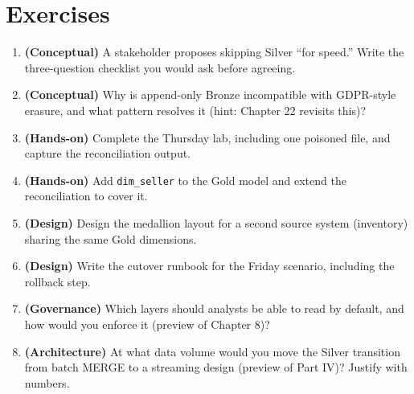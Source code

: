 \section{Exercises}
\begin{enumerate}
    \item \textbf{(Conceptual)} A stakeholder proposes skipping Silver ``for speed.'' Write the three-question checklist you would ask before agreeing.
    \item \textbf{(Conceptual)} Why is append-only Bronze incompatible with GDPR-style erasure, and what pattern resolves it (hint: Chapter 22 revisits this)?
    \item \textbf{(Hands-on)} Complete the Thursday lab, including one poisoned file, and capture the reconciliation output.
    \item \textbf{(Hands-on)} Add \texttt{dim\_seller} to the Gold model and extend the reconciliation to cover it.
    \item \textbf{(Design)} Design the medallion layout for a second source system (inventory) sharing the same Gold dimensions.
    \item \textbf{(Design)} Write the cutover runbook for the Friday scenario, including the rollback step.
    \item \textbf{(Governance)} Which layers should analysts be able to read by default, and how would you enforce it (preview of Chapter 8)?
    \item \textbf{(Architecture)} At what data volume would you move the Silver transition from batch MERGE to a streaming design (preview of Part IV)? Justify with numbers.
\end{enumerate}
